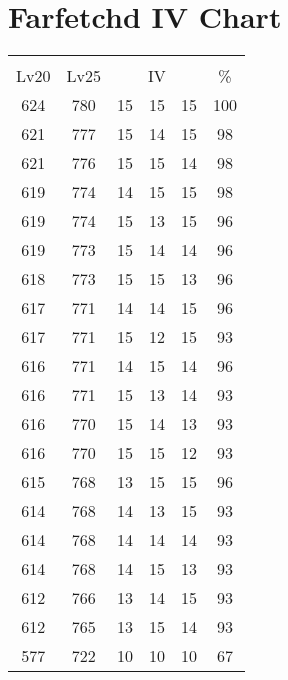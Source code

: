 \documentclass{article}%
\begin{document}
%
\normalsize%
\section{Farfetchd IV Chart}%
\label{sec:Farfetchd IV Chart}%
\renewcommand{\arraystretch}{1.5}%
\begin{tabular}{|c|c|c|c|c|c|}%
\hline%
\multicolumn{6}{|c|}{\textcolor{white}{ 
\linebreak{Farfetchd}
}%
\cellcolor{black}}\\%
\multicolumn{1}{|c}{Lv20}&\multicolumn{1}{c|}{Lv25}&\multicolumn{3}{c|}{IV}&\multicolumn{1}{|c|}{\%}\\%
\hline%
\rowcolor{color100}%
624&780&15&15&15&100\\%
\hline%
\rowcolor{color98}%
621&777&15&14&15&98\\%
\hline%
\rowcolor{color98}%
621&776&15&15&14&98\\%
\hline%
\rowcolor{color98}%
619&774&14&15&15&98\\%
\hline%
\rowcolor{color96}%
619&774&15&13&15&96\\%
\hline%
\rowcolor{color96}%
619&773&15&14&14&96\\%
\hline%
\rowcolor{color96}%
618&773&15&15&13&96\\%
\hline%
\rowcolor{color96}%
617&771&14&14&15&96\\%
\hline%
\rowcolor{color93}%
617&771&15&12&15&93\\%
\hline%
\rowcolor{color96}%
616&771&14&15&14&96\\%
\hline%
\rowcolor{color93}%
616&771&15&13&14&93\\%
\hline%
\rowcolor{color93}%
616&770&15&14&13&93\\%
\hline%
\rowcolor{color93}%
616&770&15&15&12&93\\%
\hline%
\rowcolor{color96}%
615&768&13&15&15&96\\%
\hline%
\rowcolor{color93}%
614&768&14&13&15&93\\%
\hline%
\rowcolor{color93}%
614&768&14&14&14&93\\%
\hline%
\rowcolor{color93}%
614&768&14&15&13&93\\%
\hline%
\rowcolor{color93}%
612&766&13&14&15&93\\%
\hline%
\rowcolor{color93}%
612&765&13&15&14&93\\%
\hline%
\rowcolor{color91}%
577&722&10&10&10&67\\%
\end{tabular}

%
\end{document}
